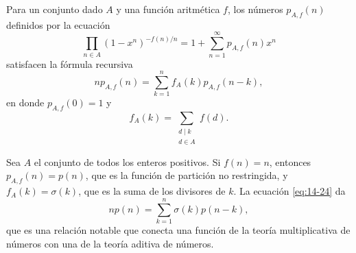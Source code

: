     \begin{teorema}\label{teo:14-8}
        Para un conjunto dado $A$ y una función aritmética $f$, los números $p_{A,f}(n)$
        definidos por la ecuación
        \begin{equation}\label{eq:14-23}
            \prod_{n\in A}(1-x^n)^{-f(n)/n}=1+\sum_{n=1}^{\infty}p_{A,f}(n)x^n
        \end{equation}
        satisfacen la fórmula recursiva
        \begin{equation}\label{eq:14-24}
            np_{A,f}(n)=\sum_{k=1}^{n}f_A(k)p_{A,f}(n-k),
        \end{equation}
        en donde $p_{A,f}(0)=1$ y
        \begin{equation*}
            f_A(k)=\sum_{\substack{d\mid k\\d\in A}}f(d).
        \end{equation*}
    \end{teorema}

    \begin{ejemplo}
        Sea $A$ el conjunto de todos los enteros positivos. Si $f(n)=n$, entonces
        $p_{A,f}(n)=p(n)$, que es la función de partición no restringida, y
        $f_A(k)=\sigma(k)$, que es la suma de los divisores de $k$. La ecuación
        \eqref{eq:14-24} da
        \begin{equation*}
            np(n)=\sum_{k=1}^{n}\sigma(k)p(n-k),
        \end{equation*}
        que es una relación notable que conecta una función de la teoría multiplicativa de
        números con una de la teoría aditiva de números.
    \end{ejemplo}

